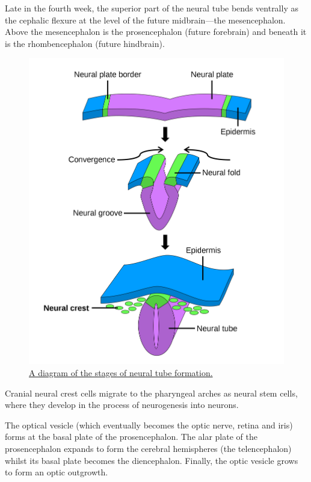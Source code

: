 Late in the fourth week, the superior part of the neural tube bends ventrally as the cephalic flexure at the level of the future midbrain---the mesencephalon. Above the mesencephalon is the prosencephalon (future forebrain) and beneath it is the rhombencephalon (future hindbrain).



\begin{figure}

{\centering \includegraphics[width=0.7\linewidth]{./figures/development/neurulation} 

}

\caption{\href{https://en.wikipedia.org/wiki/Neural_tube\#/media/File:Neural_crest.svg}{A diagram of the stages of neural tube formation.}}\label{fig:neurulation}
\end{figure}

Cranial neural crest cells migrate to the pharyngeal arches as neural stem cells, where they develop in the process of neurogenesis into neurons.

The optical vesicle (which eventually becomes the optic nerve, retina and iris) forms at the basal plate of the prosencephalon. The alar plate of the prosencephalon expands to form the cerebral hemispheres (the telencephalon) whilst its basal plate becomes the diencephalon. Finally, the optic vesicle grows to form an optic outgrowth.




